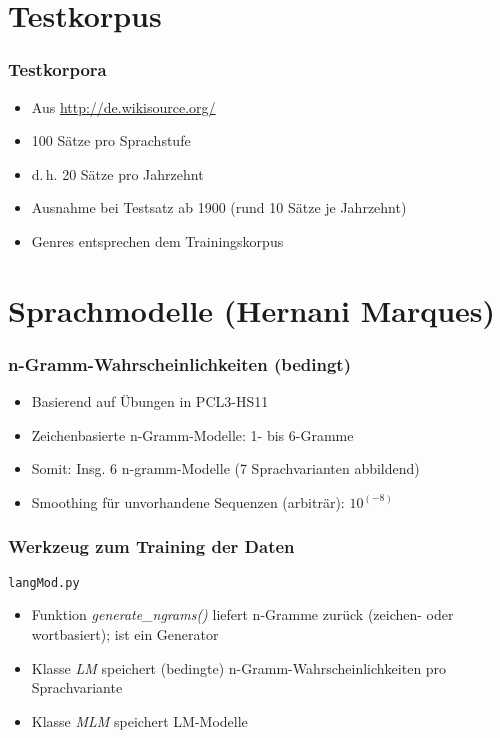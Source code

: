 \documentclass[t]{beamer} %
\begin{document}
\section{Testkorpus}

\begin{frame}
  \frametitle{Testkorpora}
  \begin{itemize}
  \item Aus \url{http://de.wikisource.org/}\pause
  \vspace*{1ex}
  \item 100 Sätze pro Sprachstufe\pause
  \item d.\,h. 20 Sätze pro Jahrzehnt\pause
  \item Ausnahme bei Testsatz ab 1900 (rund 10 Sätze je Jahrzehnt)\pause
  \vspace*{1ex}
  \item Genres entsprechen dem Trainingskorpus
  \end{itemize}  
\end{frame}

\section{Sprachmodelle (Hernani Marques)}

\begin{frame}
  \frametitle{n-Gramm-Wahrscheinlichkeiten (bedingt)}
  \begin{itemize}
  \item Basierend auf Übungen in PCL3-HS11\pause
  \vspace*{1ex}
  \item Zeichenbasierte n-Gramm-Modelle: 1- bis 6-Gramme\pause
  \item Somit: Insg. 6 n-gramm-Modelle (7 Sprachvarianten abbildend)\pause
  \item Smoothing für unvorhandene Sequenzen (arbiträr): $10^(-8)$
  \vspace*{1ex}
  \end{itemize}  
\end{frame}

% 
\begin{frame}
  \frametitle{Werkzeug zum Training der Daten}
  \texttt{langMod.py}
  \begin{itemize}
  \item Funktion \emph{generate\_ngrams()} liefert n-Gramme zurück (zeichen- oder wortbasiert); ist ein Generator\pause
  \item Klasse \emph{LM} speichert (bedingte) n-Gramm-Wahrscheinlichkeiten pro Sprachvariante\pause
  \item Klasse \emph{MLM} speichert LM-Modelle
  \vspace*{1ex}
  \end{itemize}  
\end{frame}
\end{document}
